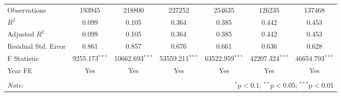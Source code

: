 \begin{tabular}{@{\extracolsep{5pt}}lcccccc}
    Observations        & 193945                                                               & 218800            & 227252            & 254635            & 126235            & 137468            \\
    $R^2$               & 0.099                                                                & 0.105             & 0.364             & 0.385             & 0.442             & 0.453             \\
    Adjusted $R^2$      & 0.099                                                                & 0.105             & 0.364             & 0.385             & 0.442             & 0.453             \\
    Residual Std. Error & 0.861                                                                & 0.857             & 0.676             & 0.661             & 0.636             & 0.628             \\
    F Statistic         & 9255.173$^{***}$                                                     & 10662.693$^{***}$ & 53559.211$^{***}$ & 63522.959$^{***}$ & 42207.324$^{***}$ & 46654.793$^{***}$ \\
    Year FE             & Yes                                                                  & Yes               & Yes               & Yes               & Yes               & Yes               \\
    \hline
    \hline                                                                                                                                                                                         \\[-1.8ex]
    \textit{Note:}      & \multicolumn{6}{r}{$^{*}$p$<$0.1; $^{**}$p$<$0.05; $^{***}$p$<$0.01}                                                                                                     \\
\end{tabular}

